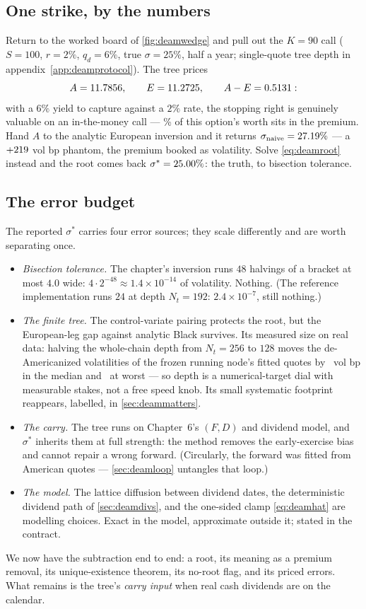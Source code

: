 \subsection{One strike, by the numbers}

Return to the worked board of \cref{fig:deamwedge} and pull out the
$K=90$ call ($S=100$, $r=2\%$, $q_d=6\%$, true $\sigma=25\%$, half a
year; single-quote tree depth in appendix~\ref{app:deamprotocol}).
The tree prices
\[
A=11.7856,
\qquad
E=11.2725,
\qquad
A-E=0.5131 :
\]
with a $6\%$ yield to capture against a $2\%$ rate, the stopping
right is genuinely valuable on an in-the-money call ---
\MacDeamWexPremiumPct\% of this option's worth sits in the premium.
Hand $A$ to the analytic European inversion and it returns
$\sigma_{\text{naive}}=27.19\%$ --- a
$+219$ vol bp phantom, the premium booked as
volatility.  Solve \eqref{eq:deamroot} instead and the root comes
back $\sigma^*=25.00\%$: the truth, to bisection
tolerance.

\subsection{The error budget}

The reported $\sigma^*$ carries four error sources; they scale
differently and are worth separating once.
\begin{itemize}[leftmargin=1.6em,itemsep=2pt]
\item \emph{Bisection tolerance.}  The chapter's inversion runs $48$
halvings of a bracket at most $4.0$ wide:
$4\cdot2^{-48}\approx1.4\times10^{-14}$ of volatility.  Nothing.
(The reference implementation runs $24$ at depth $N_t=192$: $2.4\times
10^{-7}$, still nothing.)
\item \emph{The finite tree.}  The control-variate pairing protects
the root, but the European-leg gap against analytic Black survives.  Its
measured size on real data: halving the whole-chain depth from
$N_t=256$ to $128$ moves the de-Americanized volatilities of the
frozen running node's fitted quotes by \MacDeamTblDepthMedianBp\ vol
bp in the median and \MacDeamTblDepthMaxBp\ at worst --- so depth is
a numerical-target dial with measurable stakes, not a free speed
knob.  Its small systematic footprint reappears, labelled, in
\cref{sec:deammatters}.
\item \emph{The carry.}  The tree runs on Chapter~6's $(F,D)$ and
dividend model, and $\sigma^*$ inherits them at full strength: the
method removes the early-exercise bias and cannot repair a wrong
forward.  (Circularly, the forward was fitted from American quotes
--- \cref{sec:deamloop} untangles that loop.)
\item \emph{The model.}  The lattice diffusion between dividend
dates, the deterministic dividend path of \cref{sec:deamdivs}, and
the one-sided clamp \eqref{eq:deamhat} are modelling choices.  Exact
in the model, approximate outside it; stated in the contract.
\end{itemize}

We now have the subtraction end to end: a root, its meaning as a
premium removal, its unique-existence theorem, its no-root flag,
and its priced errors.  What remains is the tree's
\emph{carry input} when real cash dividends are on the calendar.
